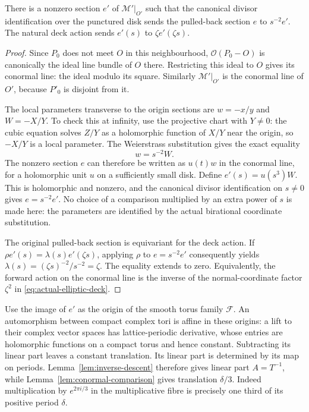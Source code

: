 \begin{lemma}\label{lem:conormal-comparison}
There is a nonzero section $e'$ of $\mathcal M'|_{O'}$ such that
the canonical divisor identification over the punctured disk sends
the pulled-back section $e$ to $s^{-2}e'$. The natural deck action
sends $e'(s)$ to $\zeta e'(\zeta s)$.
\end{lemma}
\begin{proof}
Since $P_0$ does not meet $O$ in this neighbourhood,
$\mathcal O(P_0-O)$ is canonically the ideal line bundle of $O$
there. Restricting this ideal to $O$ gives its conormal line:
the ideal modulo its square. Similarly $\mathcal M'|_{O'}$ is
the conormal line of $O'$, because $P'_0$ is disjoint from it.

The local parameters transverse to the origin sections are
$w=-x/y$ and $W=-X/Y$. To check this at infinity, use the
projective chart with $Y\ne0$: the cubic equation solves $Z/Y$
as a holomorphic function of $X/Y$ near the origin, so $-X/Y$
is a local parameter. The Weierstrass substitution gives the
exact equality
\begin{equation}\label{eq:conormal-coordinate}
                         w=s^{-2}W.
\end{equation}
The nonzero section $e$ can therefore be written as $u(t)w$ in
the conormal line, for a holomorphic unit $u$ on a sufficiently
small disk. Define $e'(s)=u(s^3)W$. This is holomorphic and
nonzero, and the canonical divisor identification on $s\ne0$
gives $e=s^{-2}e'$. No choice of a comparison multiplied by an
extra power of $s$ is made here: the parameters are identified
by the actual birational coordinate substitution.

The original pulled-back section is equivariant for the deck
action. If $\rho e'(s)=\lambda(s)e'(\zeta s)$, applying $\rho$
to $e=s^{-2}e'$ consequently yields
$\lambda(s)=(\zeta s)^{-2}/s^{-2}=\zeta$.
The equality extends to zero. Equivalently, the forward action on
the conormal line is the inverse of the normal-coordinate factor
$\zeta^2$ in \eqref{eq:actual-elliptic-deck}.
\end{proof}

Use the image of $e'$ as the origin of the smooth torus family
$\mathcal F$. An automorphism between compact complex tori is
affine in these origins: a lift to their complex vector spaces
has lattice-periodic derivative, whose entries are holomorphic
functions on a compact torus and hence constant. Subtracting its
linear part leaves a constant translation. Its linear part is
determined by its map on periods. Lemma~\ref{lem:inverse-descent}
therefore gives linear part $A=T^{-1}$, while
Lemma~\ref{lem:conormal-comparison} gives translation $\delta/3$.
Indeed multiplication by $e^{2\pi i/3}$ in the multiplicative
fibre is precisely one third of its positive period $\delta$.

